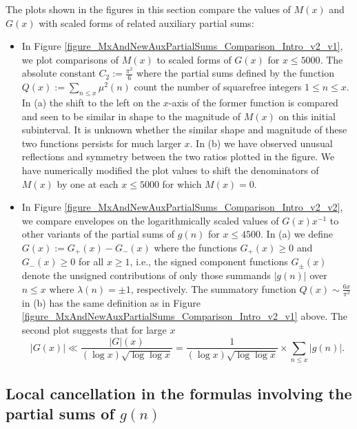\documentclass[11pt,reqno,a4letter]{article}
\newcommand{\hlocalref}[1]{\hyperref[#1]{\ref{#1}}}
\numberwithin{equation}{section}
\numberwithin{figure}{section}
\numberwithin{table}{section}
\theoremstyle{plain}
\numberwithin{theorem}{section}
\theoremstyle{definition}
\theoremstyle{remark}
\begin{document}
The plots shown in the figures in this section compare 
the values of $M(x)$ and $G(x)$ with scaled forms of related auxiliary partial sums: 
\begin{itemize}

\item In Figure \hlocalref{figure_MxAndNewAuxPartialSums_Comparison_Intro_v2_v1}, 
      we plot comparisons of $M(x)$ to scaled forms of $G(x)$ for $x \leq 5000$. The 
      absolute constant $C_2 := \frac{\pi^2}{6}$ where the partial sums defined by the function 
      $Q(x) := \sum_{n \leq x} \mu^2(n)$ count the number of squarefree integers $1 \leq n \leq x$. 
      In (a) the shift to the left on the $x$-axis of the former function 
      is compared and seen to be similar in shape to the magnitude of $M(x)$ on this initial subinterval. 
      It is unknown whether the similar shape and magnitude of these two functions persists for 
      much larger $x$. 
      In (b) we have observed unusual reflections and symmetry between the two ratios plotted in the 
      figure. We have numerically modified the plot values to shift the denominators of 
      $M(x)$ by one at each $x \leq 5000$ for which $M(x) = 0$. 

\item In Figure \hlocalref{figure_MxAndNewAuxPartialSums_Comparison_Intro_v2_v2}, we compare 
      envelopes on the logarithmically scaled values of $G(x) x^{-1}$ to other variants of 
      the partial sums of $g(n)$ for $x \leq 4500$. 
      In (a) we define $G(x) := G_{+}(x) - G_{-}(x)$ where the functions 
      $G_{+}(x) \geq 0$ and $G_{-}(x) \geq 0$ for all $x \geq 1$, 
      i.e., the signed component functions $G_{\pm}(x)$ 
      denote the unsigned contributions of only those summands 
      $|g(n)|$ over $n \leq x$ where $\lambda(n) = \pm 1$, respectively. 
      The summatory function $Q(x) \sim \frac{6x}{\pi^2}$ 
      in (b) has the same definition as in 
      Figure \hlocalref{figure_MxAndNewAuxPartialSums_Comparison_Intro_v2_v1} above. 
      The second plot suggests that for large $x$ 
      \[
      |G(x)| \ll \frac{|G|(x)}{(\log x) \sqrt{\log\log x}} = 
           \frac{1}{(\log x) \sqrt{\log\log x}} \times \sum_{n \leq x} |g(n)|.
      \]

\end{itemize}

\subsection{Local cancellation in 
	    the formulas involving the partial sums of $g(n)$} 
\label{subSection_LocalCancellationOfGInvx} 
\end{document}
